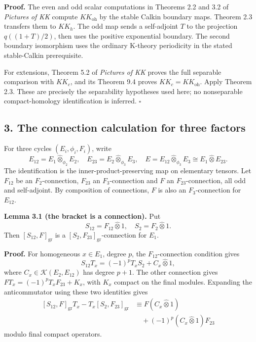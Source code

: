 \documentclass[
  11pt,
]{article}
\begin{document}
\textbf{Proof.} The even and odd scalar computations in Theorems 2.2 and
3.2 of \emph{Pictures of KK} compute \(KK_{\mathrm{oh}}\) by the stable
Calkin boundary maps. Theorem 2.3 transfers them to \(KK_h\). The odd
map sends a self-adjoint \(T\) to the projection \(q((1+T)/2)\), then
uses the positive exponential boundary. The second boundary isomorphism
uses the ordinary K-theory periodicity in the stated stable-Calkin
prerequisite.

For extensions, Theorem 5.2 of \emph{Pictures of KK} proves the full
separable comparison with \(KK_c\), and its Theorem 9.4 proves
\(KK_c=KK_{\mathrm{oh}}\). Apply Theorem 2.3. These are precisely the
separability hypotheses used here; no nonseparable compact-homology
identification is inferred. \(\square\)

\subsection{3. The connection calculation for three
factors}\label{the-connection-calculation-for-three-factors}

For three cycles \((E_i,\phi_i,F_i)\), write \[
E_{12}=E_1\widehat\otimes_{\phi_2}E_2,\quad
E_{23}=E_2\widehat\otimes_{\phi_3}E_3,\quad
E=E_{12}\widehat\otimes_{\phi_3}E_3
\cong E_1\widehat\otimes E_{23}.
\] The identification is the inner-product-preserving map on elementary
tensors. Let \(F_{12}\) be an \(F_2\)-connection, \(F_{23}\) an
\(F_3\)-connection and \(F\) an \(F_{23}\)-connection, all odd and
self-adjoint. By composition of connections, \(F\) is also an
\(F_3\)-connection for \(E_{12}\).

\textbf{Lemma 3.1 (the bracket is a connection).} Put \[
S_{12}=F_{12}\widehat\otimes1,\quad S_2=F_2\widehat\otimes1.
\] Then \([S_{12},F]_{\mathrm{gr}}\) is a
\([S_2,F_{23}]_{\mathrm{gr}}\)-connection for \(E_1\).

\textbf{Proof.} For homogeneous \(x\in E_1\), degree \(p\), the
\(F_{12}\)-connection condition gives \[
S_{12}T_x=(-1)^pT_xS_2+C_x\widehat\otimes1,
\] where \(C_x\in\mathcal K(E_2,E_{12})\) has degree \(p+1\). The other
connection gives \(FT_x=(-1)^pT_xF_{23}+K_x\), with \(K_x\) compact on
the final modules. Expanding the anticommutator using these two
identities gives \[
\begin{aligned}
\left[S_{12},F\right]_{\mathrm{gr}}T_x
-T_x[S_2,F_{23}]_{\mathrm{gr}}
&\equiv F(C_x\widehat\otimes1)\\
&\quad+(-1)^p(C_x\widehat\otimes1)F_{23}
\end{aligned}
\tag{3.1}
\] modulo final compact operators.
\end{document}

